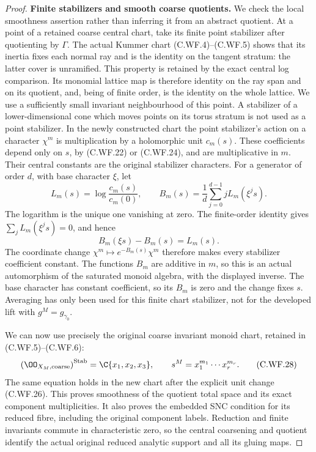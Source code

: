 \begin{proof}
\par\medskip\noindent\textbf{Finite stabilizers and smooth coarse quotients.}
We check the local smoothness assertion rather than
inferring it from an abstract quotient.  At a point
of a retained coarse central chart, take its finite
point stabilizer after quotienting by \(\Gamma\).
The actual Kummer chart (C.WF.4)--(C.WF.5) shows that
its inertia fixes each normal ray and is the identity
on the tangent stratum: the latter cover is unramified.
This property is retained by the exact central log
comparison.  Its monomial lattice map is therefore
identity on the ray span and on its quotient, and,
being of finite order, is the identity on the whole
lattice.  We use a sufficiently small invariant
neighbourhood of this point.  A stabilizer of a
lower-dimensional cone which moves points on its
torus stratum is not used as a point stabilizer.
In the newly constructed chart the point stabilizer's
action on a character \(\chi^m\)
is multiplication by a holomorphic unit \(c_m(s)\).
These coefficients depend only on \(s\), by
(C.WF.22) or (C.WF.24), and are multiplicative in \(m\).
Their central constants are the original stabilizer
characters.  For a generator of order \(d\), with
base character \(\xi\), let
\[
 L_m(s)=\log\!\frac{c_m(s)}{c_m(0)},\qquad
 B_m(s)=\frac1d\sum_{j=0}^{d-1}jL_m(\xi^js).
\tag{C.WF.26}
\]
The logarithm is the unique one vanishing at zero.
The finite-order identity gives
\(\sum_jL_m(\xi^js)=0\), and hence
\[
 B_m(\xi s)-B_m(s)=L_m(s).
\tag{C.WF.27}
\]
The coordinate change
\(\chi^m\mapsto e^{-B_m(s)}\chi^m\)
therefore makes every stabilizer coefficient constant.
The functions \(B_m\) are additive in \(m\), so this is
an actual automorphism of the saturated monoid algebra,
with the displayed inverse.  The base character has
constant coefficient, so its \(B_m\) is zero and the
change fixes \(s\).  Averaging has only been used for
this finite chart stabilizer, not for the developed
lift with \(g^M=g_{\gamma_0}\).

We can now use precisely the original coarse invariant
monoid chart, retained in (C.WF.5)--(C.WF.6):
\[
 \left(\OO_{X_M,\mathrm{coarse}}\right)^{\mathrm{Stab}}
        =\C\{x_1,x_2,x_3\},\qquad
       s^M=x_1^{m_1}\cdots x_r^{m_r}.
\tag{C.WF.28}
\]
The same equation holds in the new chart after the
explicit unit change (C.WF.26).  This proves smoothness
of the quotient total space and its exact component
multiplicities.  It also proves the embedded SNC
condition for its reduced fibre, including the original
component labels.  Reduction and finite invariants
commute in characteristic zero, so the central
coarsening and quotient identify the actual original
reduced analytic support and all its gluing maps.


\end{proof}
